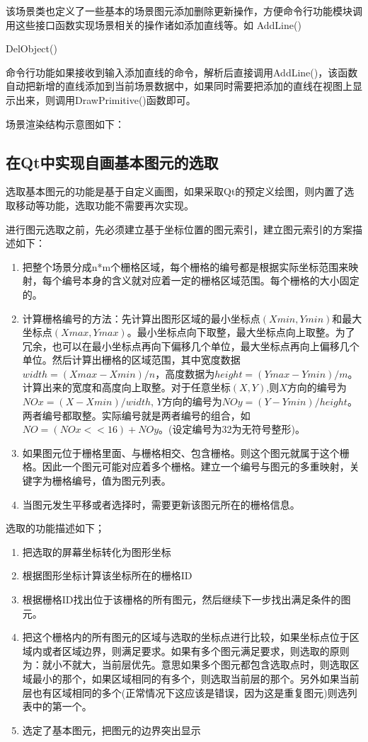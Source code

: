 该场景类也定义了一些基本的场景图元添加删除更新操作，方便命令行功能模块调用这些接口函数实现场景相关的操作诸如添加直线等。如
AddLine()

DelObject()

命令行功能如果接收到输入添加直线的命令，解析后直接调用AddLine()，该函数自动把新增的直线添加到当前场景数据中，如果同时需要把添加的直线在视图上显示出来，则调用DrawPrimitive()函数即可。

场景渲染结构示意图如下：

\subsection{在Qt中实现自画基本图元的选取} \label{SectArchTaskQtPick} 
选取基本图元的功能是基于自定义画图，如果采取Qt的预定义绘图，则内置了选取移动等功能，选取功能不需要再次实现。

进行图元选取之前，先必须建立基于坐标位置的图元索引，建立图元索引的方案描述如下：
\begin{enumerate}
	\item 把整个场景分成n*m个栅格区域，每个栅格的编号都是根据实际坐标范围来映射，每个编号本身的含义就对应着一定的栅格区域范围。每个栅格的大小固定的。
	\item 计算栅格编号的方法：先计算出图形区域的最小坐标点$(Xmin,Ymin)$和最大坐标点$(Xmax,Ymax)$。最小坐标点向下取整，最大坐标点向上取整。为了冗余，也可以在最小坐标点再向下偏移几个单位，最大坐标点再向上偏移几个单位。然后计算出栅格的区域范围，其中宽度数据$width=(Xmax- Xmin)/n$，高度数据为$height=(Ymax- Ymin)/m$。计算出来的宽度和高度向上取整。对于任意坐标$(X,Y)$,则$X$方向的编号为$NOx =  (X- Xmin)/width$, $Y$方向的编号为$NOy =  (Y- Ymin)/ height$。两者编号都取整。实际编号就是两者编号的组合，如$NO = (NOx<<16)+ NOy$。(设定编号为32为无符号整形)。
	\item 如果图元位于栅格里面、与栅格相交、包含栅格。则这个图元就属于这个栅格。因此一个图元可能对应着多个栅格。建立一个编号与图元的多重映射，关键字为栅格编号，值为图元列表。
	\item 当图元发生平移或者选择时，需要更新该图元所在的栅格信息。
\end{enumerate}

选取的功能描述如下；
\begin{enumerate}
	\item 把选取的屏幕坐标转化为图形坐标
	\item 根据图形坐标计算该坐标所在的栅格ID
	\item 根据栅格ID找出位于该栅格的所有图元，然后继续下一步找出满足条件的图元。
	\item 把这个栅格内的所有图元的区域与选取的坐标点进行比较，如果坐标点位于区域内或者区域边界，则满足要求。如果有多个图元满足要求，则选取的原则为：就小不就大，当前层优先。意思如果多个图元都包含选取点时，则选取区域最小的那个，如果区域相同的有多个，则选取当前层的那个。另外如果当前层也有区域相同的多个(正常情况下这应该是错误，因为这是重复图元)则选列表中的第一个。
	\item 选定了基本图元，把图元的边界突出显示
\end{enumerate}

